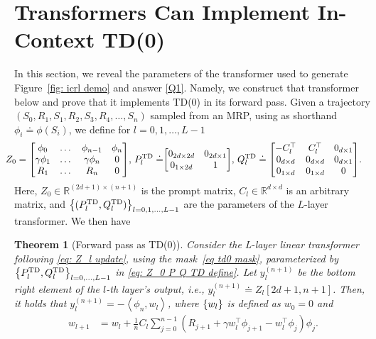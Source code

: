 \documentclass{article}
\newcommand{\R}{\mathbb{R}}
\newcommand{\indot}[2]{{\left<#1, #2\right>}}
\newcommand{\td}{\text{TD}}
\newtheorem{theorem}{Theorem}
\begin{document}
\section{Transformers Can Implement In-Context TD(0)} \label{sec: td0}
In this section,
we reveal the parameters of the transformer used to generate Figure~\ref{fig: icrl demo}
and answer \ref{Q1}.
Namely,
we construct that transformer below and prove that it implements TD(0) in its forward pass. 
Given a trajectory $(S_0, R_1, S_1, R_2, S_3, R_4, \dots, S_n)$ sampled from an MRP,
using as shorthand $\phi_i \doteq \phi(S_i)$, 
we define for $l = 0, 1, \dots, L-1$
\begin{align}
    \!\!\!\!\!\! Z_0 = \mqty[\phi_0 & \dots & \phi_{n-1} & \phi_n \\ \gamma \phi_1 & \dots & \gamma \phi_n & 0 \\ R_1 & \dots & R_n & 0], \, P_l^{\td} \doteq& \mqty[0_{2d \times 2d} & 0_{2d \times 1} \\ 0_{1 \times 2d} & 1], \,    Q_l^{\td} \doteq \mqty[-C_l^\top & C_l^\top & 0_{d \times 1} \\ 0_{d \times d} & 0_{d \times d} & 0_{d \times 1} \\ 0_{1 \times d} & 0_{1 \times d} & 0].
     \label{eq: Z_0 P Q TD define}
\end{align}
Here, $Z_0 \in \R^{(2d+1) \times (n+1)}$ is the prompt matrix, 
$C_l \in \R^{d \times d}$ is an arbitrary matrix, 
and $\qty{(P_l^\td, Q_l^\td)}_{l=0,1,\dots, L-1}$ are the parameters of the $L$-layer transformer. 
We then have
\begin{theorem}[Forward pass as TD(0)]
\label{thm: TD(0)}
    Consider the L-layer linear transformer following \eqref{eq: Z_l update}, using the mask~\eqref{eq td0 mask}, parameterized by $\qty{P_l^{\td}, Q_l^{\td}}_{l=0,\dots, L-1}$ in \eqref{eq: Z_0 P Q TD define}. 
    Let $y_l^{(n+1)}$ be the bottom right element of the $l$-th layer's output, i.e.,  $y_l^{(n+1)} \doteq Z_l[2d+1, n+1]$.
    Then, it holds that $y_l^{(n+1)} =  - \indot{\phi_n}{w_l}$,
    where $\qty{w_l}$ is defined as $w_0 = 0$ and
    \begin{align}
     w_{l+1} &\textstyle = w_l + \frac{1}{n} C_l \sum_{j=0}^{n-1}  \left(R_{j+1} + \gamma w_l^\top\phi_{j+1} - w_l^\top\phi_j\right)\phi_j. \label{eq: TD(0) w_update}
    \end{align}
\end{theorem}
\end{document}

